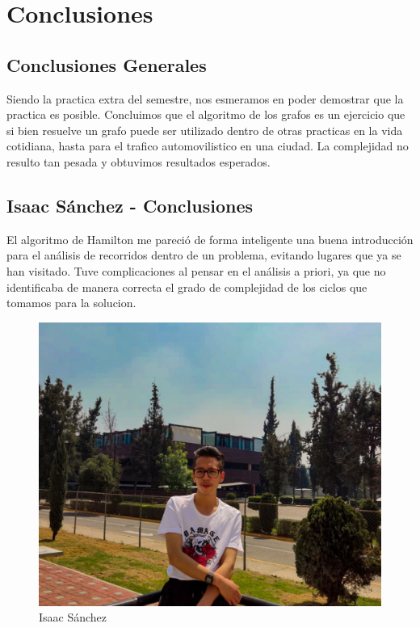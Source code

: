 \chapter{Conclusiones}

\section{Conclusiones Generales}
    
    Siendo la practica extra del semestre, nos esmeramos en poder demostrar que la practica es posible. Concluimos que el algoritmo de los grafos es un ejercicio que si bien resuelve un grafo puede ser utilizado dentro de otras practicas en la vida cotidiana, hasta para el trafico automovilistico en una ciudad. La complejidad no resulto tan pesada y obtuvimos resultados esperados.

\newpage
\section{Isaac Sánchez - Conclusiones}
    El algoritmo de Hamilton me pareció de forma inteligente una buena introducción para el análisis de recorridos dentro de un problema, evitando lugares que ya se han visitado. Tuve complicaciones al pensar en el análisis a priori, ya que no identificaba de manera correcta el grado de complejidad de los ciclos que tomamos para la solucion. 
    \begin{figure}[htp!]
            \centering
            \includegraphics[width=1 \textwidth]{Images/Fotos_Alumnos/274612600_2528992867236334_6677874837890685705_n.jpg}  
            \caption{Isaac Sánchez}
            \label{fig:my_label1}
        \end{figure}
    


